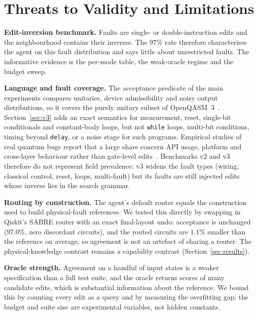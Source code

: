 \documentclass[journal]{IEEEtran}
\begin{document}
\section{Threats to Validity and Limitations}
\label{sec:threats}

\textbf{Edit-inversion benchmark.} Faults are single- or double-instruction
edits and the neighbourhood contains their inverses. The $97\%$ rate therefore
characterises the agent on this fault distribution and says little about
unrestricted faults. The informative evidence is the per-mode table, the
weak-oracle regime and the budget sweep.

\textbf{Language and fault coverage.} The acceptance predicate of the main experiments compares
unitaries, device admissibility and noisy output distributions, so it covers the purely unitary
subset of OpenQASM~3~\cite{cross2022openqasm3}. Section~\ref{sec:v3} adds an exact semantics for
measurement, reset, single-bit conditionals and constant-body loops, but not \texttt{while}
loops, multi-bit conditions, timing beyond \texttt{delay}, or a noise stage for such programs.
Empirical studies of real quantum bugs report that a large share concern API usage, platform and
cross-layer behaviour rather than gate-level edits~\cite{luo2022bugfixes, paltenghi2021bugs}.
Benchmarks v2 and v3 therefore do not represent field prevalence: v3 widens the fault types
(wiring, classical control, reset, loops, multi-fault) but its faults are still injected edits
whose inverse lies in the search grammar.

\textbf{Routing by construction.} The agent's default router equals the
construction used to build physical-fault references. We tested this directly by
swapping in Qiskit's SABRE router with an exact final-layout undo: acceptance is
unchanged ($97.0\%$, zero discordant circuits), and the routed circuits are
$1.1\%$ smaller than the reference on average, so agreement is not an artefact
of sharing a router. The physical-knowledge contrast remains a capability
contrast (Section~\ref{sec:results}).

\textbf{Oracle strength.} Agreement on a handful of input states is a weaker
specification than a full test suite, and the oracle returns scores of many
candidate edits, which is substantial information about the reference. We bound
this by counting every edit as a query and by measuring the overfitting gap;
the budget and suite size are experimental variables, not hidden constants.
\end{document}

